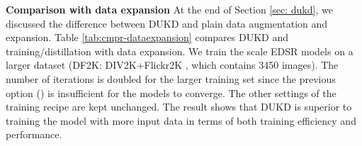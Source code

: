 \documentclass[10pt,twocolumn,letterpaper]{article}
\begin{document}
 
\vspace{0.75em}
\noindent\textbf{Comparison with data expansion} 
At the end of Section \ref{sec: dukd}, we discussed the difference between DUKD and plain data augmentation and expansion. Table \ref{tab:cmpr-dataexpansion} compares DUKD and training/distillation with data expansion. 
We train the  scale EDSR models on a larger dataset (DF2K: DIV2K+Flickr2K \cite{timofte2017ntire}, which contains 3450 images). 
The number of iterations is doubled for the larger training set since the previous option () is insufficient for the models to converge.
The other settings of the training recipe are kept unchanged.
The result shows that DUKD is superior to training the model with more input data in terms of both training efficiency and performance.

\begin{figure*}[h]
\end{figure*}
\end{document}
